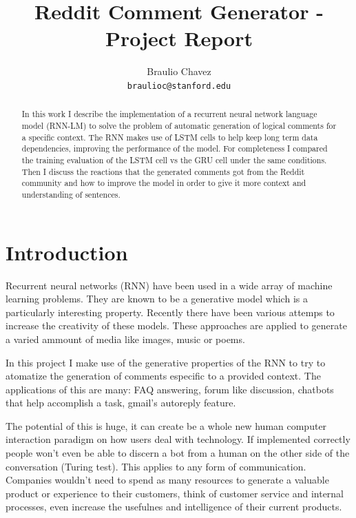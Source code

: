 \documentclass{article} %
\begin{document}
\title{Reddit Comment Generator - Project Report}
\author{Braulio Chavez \\
  \texttt{braulioc@stanford.edu}}
\maketitle

\begin{abstract}
In this work I describe the implementation of a recurrent neural network
language model (RNN-LM) to solve the problem of automatic generation of logical
comments for a specific context. The RNN makes use of LSTM cells to help keep
long term data dependencies, improving the performance of the model. For
completeness I compared the training evaluation of the LSTM cell vs the GRU cell
under the same conditions. Then I discuss the reactions that the generated
comments got from the Reddit community and how to improve the model in order to give it
more context and understanding of sentences.  \end{abstract}

\section{Introduction}
Recurrent neural networks (RNN) have been used in a wide array of machine
learning problems. They are known to be a generative model which is a
particularly interesting property. Recently there have been various attemps to
increase the creativity of these models. These approaches are applied to
generate a varied ammount of media like images, music or poems.

In this project I make use of the generative properties of the RNN to try to
atomatize the generation of comments especific to a provided context. The
applications of this are many: FAQ answering, forum like discussion, chatbots
that help accomplish a task, gmail's autoreply feature.

The potential of this is huge, it can create be a whole new human computer
interaction paradigm on how users deal with technology. If implemented correctly
people won't even be able to discern a bot from a human on the other side of the
conversation (Turing test). This applies to any form of communication. Companies
wouldn't need to spend as many resources to generate a valuable product or
experience to their customers, think of customer service and internal processes,
even increase the usefulnes and intelligence of their current products.
\end{document}
